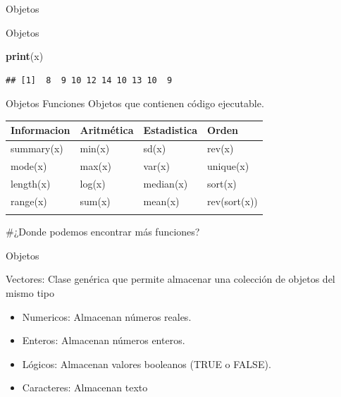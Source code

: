\documentclass[
  ignorenonframetext,
]{beamer}
\newenvironment{Shaded}{\begin{snugshade}}{\end{snugshade}}
\newcommand{\FunctionTok}[1]{\textcolor[rgb]{0.13,0.29,0.53}{\textbf{#1}}}
\newcommand{\NormalTok}[1]{#1}
\providecommand{\tightlist}{%
  \setlength{\itemsep}{0pt}\setlength{\parskip}{0pt}}
\begin{document}
\begin{frame}[fragile]{Objetos}
\begin{block}{Objetos}
\begin{Shaded}
\begin{Highlighting}[]
\FunctionTok{print}\NormalTok{(x)}
\end{Highlighting}
\end{Shaded}

\begin{verbatim}
## [1]  8  9 10 12 14 10 13 10  9
\end{verbatim}
\end{block}

\begin{block}{Objetos \textbar{} Funciones}
\protect\hypertarget{objetos-funciones}{}
Objetos que contienen código ejecutable.

\begin{longtable}[]{@{}llll@{}}
\toprule\noalign{}
Informacion & Aritmética & Estadistica & Orden \\
\midrule\noalign{}
\endhead
summary(x) & min(x) & sd(x) & rev(x) \\
mode(x) & max(x) & var(x) & unique(x) \\
length(x) & log(x) & median(x) & sort(x) \\
range(x) & sum(x) & mean(x) & rev(sort(x)) \\
\bottomrule\noalign{}
\end{longtable}

\#¿Donde podemos encontrar más funciones?
\end{block}

\begin{block}{Objetos}
\protect\hypertarget{objetos-2}{}
\begin{block}{Vectores: Clase genérica que permite almacenar una
colección de objetos del mismo tipo}
\protect\hypertarget{vectores-clase-genuxe9rica-que-permite-almacenar-una-colecciuxf3n-de-objetos-del-mismo-tipo}{}
\begin{itemize}
\tightlist
\item
  Numericos: Almacenan números reales.
\item
  Enteros: Almacenan números enteros.
\item
  Lógicos: Almacenan valores booleanos (TRUE o FALSE).
\item
  Caracteres: Almacenan texto
\end{itemize}


\end{block}
\end{block}
\end{frame}
\end{document}

